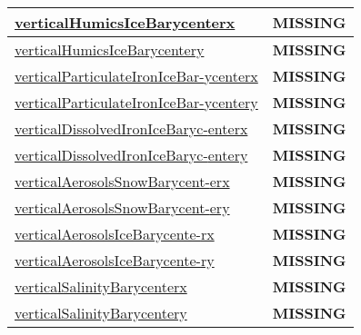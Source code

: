 {\begin{center}
\begin{longtable}{| p{2.0in} | p{4.0in} |}
    \hline
    \hyperref[subsec:var_sec_tracer_barycenter_verticalHumicsIceBarycenterx]{verticalHumicsIceBarycenterx} & {\bf \color{red} MISSING} \\
    \hline
    \hyperref[subsec:var_sec_tracer_barycenter_verticalHumicsIceBarycentery]{verticalHumicsIceBarycentery} & {\bf \color{red} MISSING} \\
    \hline
    \hyperref[subsec:var_sec_tracer_barycenter_verticalParticulateIronIceBarycenterx]{verticalParticulateIronIceBar-}\hyperref[subsec:var_sec_tracer_barycenter_verticalParticulateIronIceBarycenterx]{ycenterx  }& {\bf \color{red} MISSING} \\
    \hline
    \hyperref[subsec:var_sec_tracer_barycenter_verticalParticulateIronIceBarycentery]{verticalParticulateIronIceBar-}\hyperref[subsec:var_sec_tracer_barycenter_verticalParticulateIronIceBarycentery]{ycentery  }& {\bf \color{red} MISSING} \\
    \hline
    \hyperref[subsec:var_sec_tracer_barycenter_verticalDissolvedIronIceBarycenterx]{verticalDissolvedIronIceBaryc-}\hyperref[subsec:var_sec_tracer_barycenter_verticalDissolvedIronIceBarycenterx]{enterx  }& {\bf \color{red} MISSING} \\
    \hline
    \hyperref[subsec:var_sec_tracer_barycenter_verticalDissolvedIronIceBarycentery]{verticalDissolvedIronIceBaryc-}\hyperref[subsec:var_sec_tracer_barycenter_verticalDissolvedIronIceBarycentery]{entery  }& {\bf \color{red} MISSING} \\
    \hline
    \hyperref[subsec:var_sec_tracer_barycenter_verticalAerosolsSnowBarycenterx]{verticalAerosolsSnowBarycent-}\hyperref[subsec:var_sec_tracer_barycenter_verticalAerosolsSnowBarycenterx]{erx  }& {\bf \color{red} MISSING} \\
    \hline
    \hyperref[subsec:var_sec_tracer_barycenter_verticalAerosolsSnowBarycentery]{verticalAerosolsSnowBarycent-}\hyperref[subsec:var_sec_tracer_barycenter_verticalAerosolsSnowBarycentery]{ery  }& {\bf \color{red} MISSING} \\
    \hline
    \hyperref[subsec:var_sec_tracer_barycenter_verticalAerosolsIceBarycenterx]{verticalAerosolsIceBarycente-}\hyperref[subsec:var_sec_tracer_barycenter_verticalAerosolsIceBarycenterx]{rx  }& {\bf \color{red} MISSING} \\
    \hline
    \hyperref[subsec:var_sec_tracer_barycenter_verticalAerosolsIceBarycentery]{verticalAerosolsIceBarycente-}\hyperref[subsec:var_sec_tracer_barycenter_verticalAerosolsIceBarycentery]{ry  }& {\bf \color{red} MISSING} \\
    \hline
    \hyperref[subsec:var_sec_tracer_barycenter_verticalSalinityBarycenterx]{verticalSalinityBarycenterx} & {\bf \color{red} MISSING} \\
    \hline
    \hyperref[subsec:var_sec_tracer_barycenter_verticalSalinityBarycentery]{verticalSalinityBarycentery} & {\bf \color{red} MISSING} \\
    \hline
\end{longtable}
\end{center}
}
